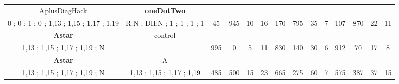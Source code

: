 \begin{table}[H]
{\begin{tabular}{|c|c|c|c|c|c|c|c|c|c|c|c|c|c|}
AplusDiagHack & \cellcolor{blue!15}\textbf{oneDotTwo}& {\color[HTML]{00009B} } & {\color[HTML]{9A0000} } & {\color[HTML]{009901} } &  & {\color[HTML]{00009B} } & {\color[HTML]{9A0000} } & {\color[HTML]{009901} } &  & {\color[HTML]{00009B} } & {\color[HTML]{9A0000} } & {\color[HTML]{009901} } &  \\ 
0 ; 0 ; 1 ; 0 ; 1,13 ; 1,15 ; 1,17 ; 1,19 & \cellcolor{ blue!15}R:N ; DH:N ; 1 ; 1 ; 1 ; 1 & \multirow{-2}{*}{{\color[HTML]{00009B} 45}} & \multirow{-2}{*}{{\color[HTML]{9A0000} 945}} & \multirow{-2}{*}{{\color[HTML]{009901} 10}} & \multirow{-2}{*}{16} & \multirow{-2}{*}{{\color[HTML]{00009B} 170}} & \multirow{-2}{*}{{\color[HTML]{9A0000} 795}} & \multirow{-2}{*}{{\color[HTML]{009901} 35}} & \multirow{-2}{*}{7} & \multirow{-2}{*}{{\color[HTML]{00009B} 107}} & \multirow{-2}{*}{{\color[HTML]{9A0000} 870}} & \multirow{-2}{*}{{\color[HTML]{009901} 22}} & \multirow{-2}{*}{11} \\ \hline

\cellcolor{blue!15}\textbf{Astar} & control& {\color[HTML]{00009B} } & {\color[HTML]{9A0000} } & {\color[HTML]{009901} } &  & {\color[HTML]{00009B} } & {\color[HTML]{9A0000} } & {\color[HTML]{009901} } &  & {\color[HTML]{00009B} } & {\color[HTML]{9A0000} } & {\color[HTML]{009901} } &  \\ 
\cellcolor{ blue!15}1,13 ; 1,15 ; 1,17 ; 1,19 ; N &  & \multirow{-2}{*}{{\color[HTML]{00009B} 995}} & \multirow{-2}{*}{{\color[HTML]{9A0000} 0}} & \multirow{-2}{*}{{\color[HTML]{009901} 5}} & \multirow{-2}{*}{11} & \multirow{-2}{*}{{\color[HTML]{00009B} 830}} & \multirow{-2}{*}{{\color[HTML]{9A0000} 140}} & \multirow{-2}{*}{{\color[HTML]{009901} 30}} & \multirow{-2}{*}{6} & \multirow{-2}{*}{{\color[HTML]{00009B} 912}} & \multirow{-2}{*}{{\color[HTML]{9A0000} 70}} & \multirow{-2}{*}{{\color[HTML]{009901} 17}} & \multirow{-2}{*}{8} \\ \hline

\cellcolor{blue!15}\textbf{Astar} & A& {\color[HTML]{00009B} } & {\color[HTML]{9A0000} } & {\color[HTML]{009901} } &  & {\color[HTML]{00009B} } & {\color[HTML]{9A0000} } & {\color[HTML]{009901} } &  & {\color[HTML]{00009B} } & {\color[HTML]{9A0000} } & {\color[HTML]{009901} } &  \\ 
\cellcolor{ blue!15}1,13 ; 1,15 ; 1,17 ; 1,19 ; N & 1,13 ; 1,15 ; 1,17 ; 1,19 & \multirow{-2}{*}{{\color[HTML]{00009B} 485}} & \multirow{-2}{*}{{\color[HTML]{9A0000} 500}} & \multirow{-2}{*}{{\color[HTML]{009901} 15}} & \multirow{-2}{*}{23} & \multirow{-2}{*}{{\color[HTML]{00009B} 665}} & \multirow{-2}{*}{{\color[HTML]{9A0000} 275}} & \multirow{-2}{*}{{\color[HTML]{009901} 60}} & \multirow{-2}{*}{7} & \multirow{-2}{*}{{\color[HTML]{00009B} 575}} & \multirow{-2}{*}{{\color[HTML]{9A0000} 387}} & \multirow{-2}{*}{{\color[HTML]{009901} 37}} & \multirow{-2}{*}{15} \\ \hline


\end{tabular}}
\end{table}

